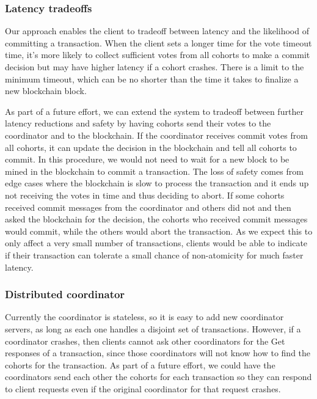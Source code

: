 \documentclass[11pt,conference]{IEEEtran}
\begin{document}
\subsubsection{Latency tradeoffs}
Our approach enables the client to tradeoff between latency and the likelihood of committing a transaction. When the client sets a longer time for the vote timeout time, it’s more likely to collect sufficient votes from all cohorts to make a commit decision but may have higher latency if a cohort crashes. There is a limit to the minimum timeout, which can be no shorter than the time it takes to finalize a new blockchain block.

As part of a future effort, we can extend the system to tradeoff between further latency reductions and safety by having cohorts send their votes to the coordinator and to the blockchain. If the coordinator receives commit votes from all cohorts, it can update the decision in the blockchain and tell all cohorts to commit. In this procedure, we would not need to wait for a new block to be mined in the blockchain to commit a transaction. The loss of safety comes from edge cases where the blockchain is slow to process the transaction and it ends up not receiving the votes in time and thus deciding to abort. If some cohorts received commit messages from the coordinator and others did not and then asked the blockchain for the decision, the cohorts who received commit messages would commit, while the others would abort the transaction. As we expect this to only affect a very small number of transactions, clients would be able to indicate if their transaction can tolerate a small chance of non-atomicity for much faster latency.

\subsubsection{Distributed coordinator}
Currently the coordinator is stateless, so it is easy to add new coordinator servers, as long as each one handles a disjoint set of transactions. However, if a coordinator crashes, then clients cannot ask other coordinators for the Get responses of a transaction, since those coordinators will not know how to find the cohorts for the transaction. As part of a future effort, we could have the coordinators send each other the cohorts for each transaction so they can respond to client requests even if the original coordinator for that request crashes.



\end{document}
